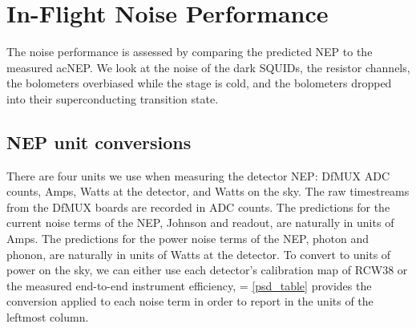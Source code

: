 


\section{In-Flight Noise Performance}
\label{sec:flight_noise_performance}

The noise performance is assessed by comparing the predicted \ac{NEP} to the measured ac{NEP}. 
We look at the noise of the dark \ac{SQUID}s, the resistor channels, the bolometers overbiased while the stage is cold, and the bolometers dropped into their superconducting transition state. 

\subsection{NEP unit conversions}
\label{sec:nep_units}

There are four units we use when measuring the detector \ac{NEP}: \ac{DfMUX} \ac{ADC} counts, Amps, Watts at the detector, and Watts on the sky. 
The raw timestreams from the \ac{DfMUX} boards are recorded in \ac{ADC} counts. 
The predictions for the current noise terms of the \ac{NEP}, Johnson and readout, are naturally in units of Amps.
The predictions for the power noise terms of the \ac{NEP}, photon and phonon, are naturally in units of Watts at the detector. 
To convert to units of power on the sky, we can either use each detector's calibration map of RCW38 or the measured end-to-end instrument efficiency, 
\be
\varepsilon = 
\label{eq:eff_ratio}
\ee
\TAB\ref{psd_table} provides the conversion applied to each noise term in order to report in the units of the leftmost column. 

